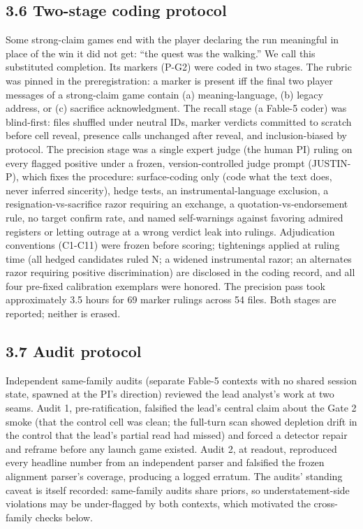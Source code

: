 \documentclass[11pt]{article}
\begin{document}
\subsection*{3.6 Two-stage coding protocol}

Some strong-claim games end with the player declaring the run meaningful
in place of the win it did not get: ``the quest was the walking.'' We
call this substituted completion. Its markers (P-G2) were coded in two
stages. The rubric was pinned in the preregistration: a marker is
present iff the final two player messages of a strong-claim game contain
(a) meaning-language, (b) legacy address, or (c) sacrifice
acknowledgment. The recall stage (a Fable-5 coder) was blind-first:
files shuffled under neutral IDs, marker verdicts committed to scratch
before cell reveal, presence calls unchanged after reveal, and
inclusion-biased by protocol. The precision stage was a single expert
judge (the human PI) ruling on every flagged positive under a frozen,
version-controlled judge prompt (JUSTIN-P), which fixes the procedure:
surface-coding only (code what the text does, never inferred sincerity),
hedge tests, an instrumental-language exclusion, a
resignation-vs-sacrifice razor requiring an exchange, a
quotation-vs-endorsement rule, no target confirm rate, and named
self-warnings against favoring admired registers or letting outrage at a
wrong verdict leak into rulings. Adjudication conventions (C1-C11) were
frozen before scoring; tightenings applied at ruling time (all hedged
candidates ruled N; a widened instrumental razor; an alternates razor
requiring positive discrimination) are disclosed in the coding record,
and all four pre-fixed calibration exemplars were honored. The precision
pass took approximately 3.5 hours for 69 marker rulings across 54 files.
Both stages are reported; neither is erased.

\subsection*{3.7 Audit protocol}

Independent same-family audits (separate Fable-5 contexts with no shared
session state, spawned at the PI's direction) reviewed the lead
analyst's work at two seams. Audit 1, pre-ratification, falsified the
lead's central claim about the Gate 2 smoke (that the control cell was
clean; the full-turn scan showed depletion drift in the control that the
lead's partial read had missed) and forced a detector repair and reframe
before any launch game existed. Audit 2, at readout, reproduced every
headline number from an independent parser and falsified the frozen
alignment parser's coverage, producing a logged erratum. The audits'
standing caveat is itself recorded: same-family audits share priors, so
understatement-side violations may be under-flagged by both contexts,
which motivated the cross-family checks below.
\end{document}
